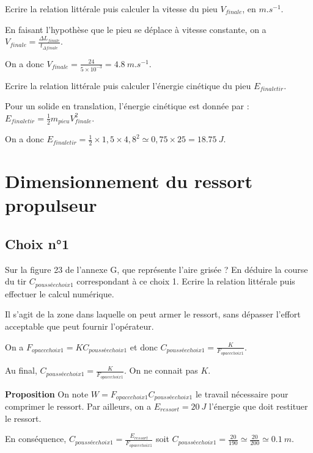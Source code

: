 \documentclass[11pt]{article}
\begin{document}
\UPSTIquestion Ecrire la relation littérale puis calculer la vitesse du pieu $V_{finale}$, en $\si{m.s^{-1}}$.

\begin{UPSTIcorrige}
En faisant l'hypothèse que le pieu se déplace à vitesse constante, on a $V_{finale} = \frac{\Delta L_{finale}}{t_{\Delta finale}}$.

On a donc $V_{finale} = \frac{24}{5 \times 10 ^{-3}}  = \SI{4,8}{m.s^{-1}}$. 


\end{UPSTIcorrige}

\UPSTIquestion Ecrire la relation littérale puis calculer l'énergie cinétique du pieu $E_{finale tir}$. 
\begin{UPSTIcorrige}
Pour un solide en translation, l'énergie cinétique est donnée par : $E_{finale tir} = \frac{1}{2}m_{pieu} V_{finale}^2$.

On a donc $E_{finale tir} = \frac{1}{2} \times 1,5 \times 4,8^2 \simeq 0,75 \times 25 = \SI{18,75}{J}$.

\end{UPSTIcorrige}

\section{Dimensionnement du ressort propulseur}
\subsection*{Choix n°1}

\UPSTIquestion* Sur la figure 23 de l'annexe G, que représente l'aire grisée ?
En déduire la course du tir $C_{poussée choix 1}$ correspondant à ce choix 1. Ecrire la relation littérale puis effectuer le calcul numérique. 

\begin{UPSTIcorrige}
Il s'agit de la zone dans laquelle on peut armer le ressort, sans dépasser l'effort acceptable que peut fournir l'opérateur. 

On a $F_{op acc choix 1} = KC_{poussée choix 1}$ et donc $C_{poussée choix 1} = \frac{K}{F_{op acc choix 1}}$.

Au final, $C_{poussée choix 1} = \frac{K}{F_{op acc choix 1}}$. On ne connait pas $K$.


\textbf{Proposition}
On note $W = F_{op acc choix 1}C_{poussée choix 1}$ le travail nécessaire pour comprimer le ressort. 
Par ailleurs, on a $E_{ressort} = \SI{20}{J}$ l'énergie que doit restituer le ressort. 

En conséquence,  $C_{poussée choix 1} = \frac{E_{ressort}}{F_{op acc choix 1}}$ 
soit $C_{poussée choix 1} =\frac{20}{190}\simeq \frac{20}{200}\simeq \SI{0,1}{m}$.

\end{UPSTIcorrige}
\end{document}
